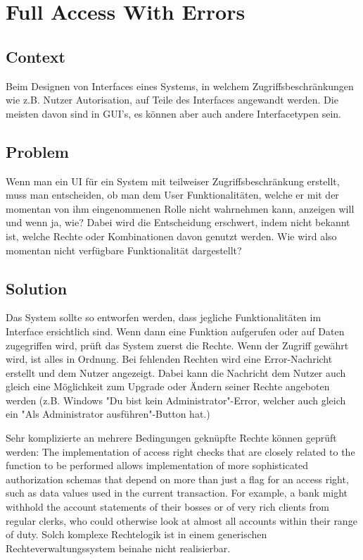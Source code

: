 \chapter{Full Access With Errors}

\section{Context}
Beim Designen von Interfaces eines Systems, in welchem Zugriffsbeschränkungen wie z.B. Nutzer Autorisation, auf Teile des Interfaces angewandt werden. Die meisten davon sind in GUI's, es können aber auch andere Interfacetypen sein.

\section{Problem}
Wenn man ein UI für ein System mit teilweiser Zugriffsbeschränkung erstellt, muss man entscheiden, ob man dem User Funktionalitäten, welche er mit der momentan von ihm eingenommenen Rolle nicht wahrnehmen kann, anzeigen will und wenn ja, wie? Dabei wird die Entscheidung erschwert, indem nicht bekannt ist, welche Rechte oder Kombinationen davon genutzt werden. Wie wird also momentan nicht verfügbare Funktionalität dargestellt?

\section{Solution}
Das System sollte so entworfen werden, dass jegliche Funktionalitäten im Interface ersichtlich sind. Wenn dann eine Funktion aufgerufen oder auf Daten zugegriffen wird, prüft das System zuerst die Rechte. Wenn der Zugriff gewährt wird, ist alles in Ordnung. Bei fehlenden Rechten wird eine Error-Nachricht erstellt und dem Nutzer angezeigt. Dabei kann die Nachricht dem Nutzer auch gleich eine Möglichkeit zum Upgrade oder Ändern seiner Rechte angeboten werden (z.B. Windows "Du bist kein Administrator"-Error, welcher auch gleich ein "Als Administrator ausführen"-Button hat.)

Sehr komplizierte an mehrere Bedingungen geknüpfte Rechte können geprüft werden:
The implementation of access right checks that are closely related to the function to be performed allows implementation of more sophisticated authorization schemas that depend on more than just a flag for an access right, such as data values used in the current transaction. For example, a bank might withhold the account statements of their bosses or of very rich clients from regular clerks, who could otherwise look at almost all accounts within their range of duty.
Solch komplexe Rechtelogik ist in einem generischen Rechteverwaltungssystem beinahe nicht realisierbar.

